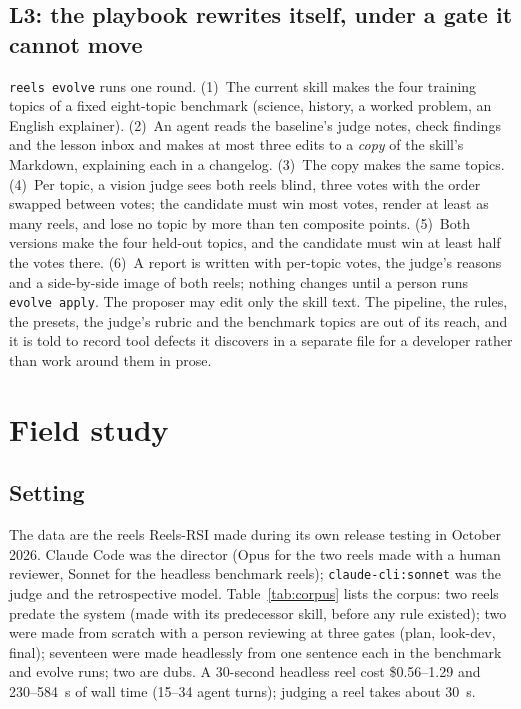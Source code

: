 \documentclass[11pt]{article}
\newcommand{\sys}{Reels-RSI}
\begin{document}
\subsection{L3: the playbook rewrites itself, under a gate it cannot move}
\label{sec:evolve-method}
\texttt{reels evolve} runs one round. (1)~The current skill makes the four training topics of a
fixed eight-topic benchmark (science, history, a worked problem, an English explainer). (2)~An agent
reads the baseline's judge notes, check findings and the lesson inbox and makes at most three edits
to a \emph{copy} of the skill's Markdown, explaining each in a changelog. (3)~The copy makes the same
topics. (4)~Per topic, a vision judge sees both reels blind, three votes with the order swapped
between votes; the candidate must win most votes, render at least as many reels, and lose no topic by
more than ten composite points. (5)~Both versions make the four held-out topics, and the candidate
must win at least half the votes there. (6)~A report is written with per-topic votes, the judge's
reasons and a side-by-side image of both reels; nothing changes until a person runs
\texttt{evolve apply}. The proposer may edit only the skill text. The pipeline, the rules, the
presets, the judge's rubric and the benchmark topics are out of its reach, and it is told to record
tool defects it discovers in a separate file for a developer rather than work around them in prose.

\section{Field study}
\label{sec:study}

\subsection{Setting}
The data are the reels \sys{} made during its own release testing in October 2026. Claude Code was
the director (Opus for the two reels made with a human reviewer, Sonnet for the headless benchmark
reels); \texttt{claude-cli:sonnet} was the judge and the retrospective model. Table~\ref{tab:corpus}
lists the corpus: two reels predate the system (made with its predecessor skill, before any rule
existed); two were made from scratch with a person reviewing at three gates (plan, look-dev,
final); seventeen were made headlessly from one sentence each in the benchmark and evolve runs; two
are dubs. A 30-second headless reel cost \$0.56--1.29 and 230--584~s of wall time (15--34 agent
turns); judging a reel takes about 30~s.
\end{document}
